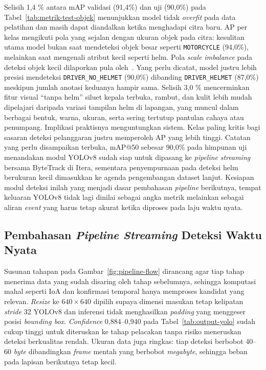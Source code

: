 Selisih 1,4 \% antara mAP validasi (91,4\%) dan uji (90,0\%) pada Tabel~\ref{tab:metrik-test-objek} menunjukkan model tidak \textit{overfit} pada data pelatihan dan masih dapat diandalkan ketika menghadapi citra baru. AP per kelas mengikuti pola yang sejalan dengan ukuran objek pada citra: kesulitan utama model bukan saat mendeteksi objek besar seperti \texttt{MOTORCYCLE} (94,0\%), melainkan saat mengenali atribut kecil seperti helm. Pola \textit{scale imbalance} pada deteksi objek kecil dilaporkan pula oleh~\cite{oksuz2020imbalance}. Yang perlu dicatat, model justru lebih presisi mendeteksi \texttt{DRIVER\_NO\_HELMET} (90,0\%) dibanding \texttt{DRIVER\_HELMET} (87,0\%) meskipun jumlah anotasi keduanya hampir sama. Selisih 3,0 \% mencerminkan fitur visual ``tanpa helm'' siluet kepala terbuka, rambut, dan kulit lebih mudah dipelajari daripada variasi tampilan helm di lapangan, yang muncul dalam berbagai bentuk, warna, ukuran, serta sering tertutup pantulan cahaya atau penumpang. Implikasi praktisnya menguntungkan sistem. Kelas paling kritis bagi sasaran deteksi pelanggaran justru memperoleh AP yang lebih tinggi. Catatan yang perlu disampaikan terbuka, mAP@50 sebesar 90,0\% pada himpunan uji menandakan modul YOLOv8 sudah siap untuk dipasang ke \textit{pipeline} \textit{streaming} bersama ByteTrack di Itera, sementara penyempurnaan pada deteksi helm berukuran kecil dimasukkan ke agenda pengembangan dataset lanjut. Kesiapan modul deteksi inilah yang menjadi dasar pembahasan \textit{pipeline} berikutnya, tempat keluaran YOLOv8 tidak lagi dinilai sebagai angka metrik melainkan sebagai aliran \textit{event} yang harus tetap akurat ketika diproses pada laju waktu nyata.

\subsection{Pembahasan \textit{Pipeline Streaming} Deteksi Waktu Nyata}
\label{subsec:pembahasan-pipeline}

Susunan tahapan pada Gambar~\ref{fig:pipeline-flow} dirancang agar tiap tahap menerima data yang sudah disaring oleh tahap sebelumnya, sehingga komputasi mahal seperti IoA dan konfirmasi temporal hanya memproses kandidat yang relevan. \textit{Resize} ke $640 \times 640$ dipilih supaya dimensi masukan tetap kelipatan \textit{stride} 32 YOLOv8 dan inferensi tidak menghasilkan \textit{padding} yang menggeser posisi \textit{bounding box}. \textit{Confidence} 0,884--0,940 pada Tabel~\ref{tab:output-yolo} sudah cukup tinggi untuk diteruskan ke tahap pelacakan tanpa risiko meneruskan deteksi berkualitas rendah. Ukuran data juga ringkas: tiap deteksi berbobot 40--60 \textit{byte} dibandingkan \textit{frame} mentah yang berbobot \textit{megabyte}, sehingga beban pada lapisan berikutnya tetap kecil.

